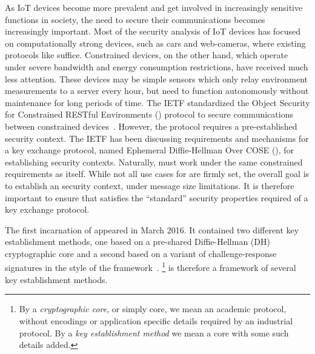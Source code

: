 \documentclass[runningheads, envcountsame, hidelinks, a4paper, draft, x11names]{llncs}
\begin{document}
As IoT devices become more prevalent and get involved in increasingly sensitive
functions in society, the need to secure their communications
becomes increasingly important.
%
Most of the security analysis of IoT devices has focused on computationally
strong devices, such as cars and web-cameras, where existing protocols like
\mDandTls{} suffice.
%
Constrained devices, on the other hand, which operate under severe
bandwidth and energy consumption restrictions, have received much less
attention.
%
These devices may be simple sensors which only relay environment
measurements to a server every hour, but need to function autonomously without
maintenance for long periods of time.
%
The IETF standardized the Object Security for
Constrained RESTful Environments (\mOscore{}) protocol to secure communications
between constrained devices~\cite{rfc8613}.
%
However, the \mOscore{} protocol requires a pre-established security context.
%
The IETF has been discussing requirements and mechanisms for a key
exchange protocol, named Ephemeral Diffie-Hellman Over COSE (\mEdhoc), for
establishing \mOscore{} security contexts.
%
Naturally, \mEdhoc{} must work under the same constrained requirements as
\mOscore{} itself.
%
While not all use cases for \mEdhoc{} are firmly set, the overall goal is to
establish an \mOscore{} security context, under message size limitations.
%
It is therefore important to ensure that \mEdhoc{} satisfies the ``standard'' security
properties required of a key exchange protocol.
%

%
The first incarnation of \mEdhoc{} appeared in March 2016.
%
It contained two different key establishment methods, one based on a
pre-shared Diffie-Hellman (DH) cryptographic core and a second based on a
variant of challenge-response signatures in the style of the \mNoise{}
framework~\cite{perrin2016noise}.
%
\footnote{By a \emph{cryptographic core}, or simply core, we mean an academic protocol,
without encodings or application specific details required by an industrial
protocol.
%
By a \emph{key establishment method} we mean a core with some such details added.}
%
\mEdhoc{} is therefore a framework of several key establishment methods.
%
\end{document}
